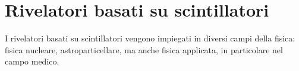 
\section{Rivelatori basati su scintillatori}
I rivelatori basati su scintillatori vengono impiegati in diversi campi della fisica: fisica nucleare, astroparticellare, ma anche fisica applicata, in particolare nel campo medico.



